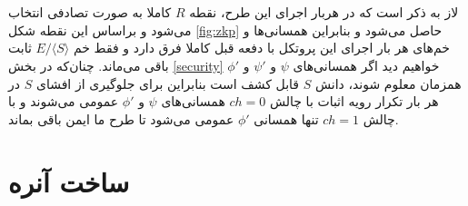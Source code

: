 \\
\\
لاز به ذکر است که در هربار اجرای این طرح، نقطه
$R$
کاملا به صورت تصادفی انتخاب می‌شود و براساس این نقطه شکل
\ref{fig:zkp}
حاصل می‌شود و بنابراین همسانی‌ها و خم‌های هر بار اجرای این پروتکل با دفعه قبل کاملا فرق دارد و فقط خم 
$E / \langle S \rangle $
ثابت باقی می‌ماند. چنان‌که در بخش 
\ref{security}
خواهیم دید اگر همسانی‌های 
$\psi$
و
${\psi}'$
و
${\phi}'$
همزمان معلوم شوند، دانش  
$S$
 قابل کشف است بنابراین برای جلوگیری از افشای 
 $S$
 در هر بار تکرار رویه اثبات با چالش 
 $ch = 0 $
 همسانی‌های 
 $\psi$
 و
 ${\phi}'$ 
 عمومی می‌شوند و با چالش
 $ch = 1$
 تنها همسانی 
 ${\phi}'$ 
 عمومی می‌شود تا طرح ما ایمن باقی بماند.
 








\section{ساخت آنره}\label{unruh}

